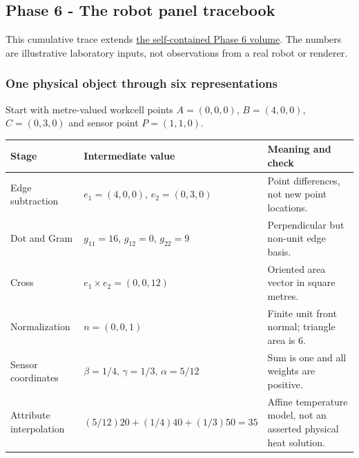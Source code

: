 \subsection{Phase 6 - The robot panel tracebook}\label{appendix-92ff77d4dfdc-phase-6---the-robot-panel-tracebook}

This cumulative trace extends \hyperref[01-foundations-i-ch017-the-panel-gives-us-a-reason-to-learn]{the self-contained Phase 6 volume}. The numbers are illustrative laboratory inputs, not observations from a real robot or renderer.

\subsubsection{One physical object through six representations}\label{appendix-92ff77d4dfdc-one-physical-object-through-six-representations}

Start with metre-valued workcell points \(A=(0,0,0)\), \(B=(4,0,0)\), \(C=(0,3,0)\) and sensor point \(P=(1,1,0)\).

{\def\LTcaptype{none} %
\begin{longtable}[]{@{}
  >{\raggedright\arraybackslash}p{}
  >{\raggedright\arraybackslash}p{}
  >{\raggedright\arraybackslash}p{}@{}}
\toprule\noalign{}
\begin{minipage}[b]{\linewidth}\raggedright
Stage
\end{minipage} & \begin{minipage}[b]{\linewidth}\raggedright
Intermediate value
\end{minipage} & \begin{minipage}[b]{\linewidth}\raggedright
Meaning and check
\end{minipage} \\
\midrule\noalign{}
\endhead
\bottomrule\noalign{}
\endlastfoot
Edge subtraction & \(e_1=(4,0,0)\), \(e_2=(0,3,0)\) & Point differences, not new point locations. \\
Dot and Gram & \(g_{11}=16\), \(g_{12}=0\), \(g_{22}=9\) & Perpendicular but non-unit edge basis. \\
Cross & \(e_1\times e_2=(0,0,12)\) & Oriented area vector in square metres. \\
Normalization & \(n=(0,0,1)\) & Finite unit front normal; triangle area is \(6\). \\
Sensor coordinates & \(\beta=1/4\), \(\gamma=1/3\), \(\alpha=5/12\) & Sum is one and all weights are positive. \\
Attribute interpolation & \((5/12)20+(1/4)40+(1/3)50=35\) & Affine temperature model, not an asserted physical heat solution. \\
\end{longtable}
}

